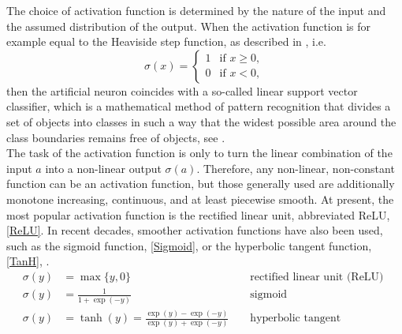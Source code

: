 The choice of activation function is determined by the nature of the input and the assumed distribution of the output. When the activation function is for example equal to the Heaviside step function, as described in \cite{Rosenblatt:1958}, i.e.
\begin{equation*}
    \sigma(x) = \begin{cases} 1 & \text{if } x \geq 0, \\ 0 & \text{if } x < 0, \end{cases}
\end{equation*}
then the artificial neuron coincides with a so-called linear support vector classifier, which is a mathematical method of pattern recognition that divides a set of objects into classes in such a way that the widest possible area around the class boundaries remains free of objects, see \cite[Chapter~7]{Bishop:2006}. \\
The task of the activation function is only to turn the linear combination of the input $a$ into a non-linear output $\sigma(a)$. Therefore, any non-linear, non-constant function can be an activation function, but those generally used are additionally monotone increasing, continuous, and at least piecewise smooth. At present, the most popular activation function is the rectified linear unit, abbreviated ReLU, \cref{ReLU}. In recent decades, smoother activation functions have also been used, such as the sigmoid function, \cref{Sigmoid}, or the hyperbolic tangent function, \cref{TanH}, \cite[p.~3]{LeCunBengioHinton:2015}.
\begin{align}
    \sigma(y) &=\max \{y, 0\} & & \text{ rectified linear unit (ReLU) } \label{ReLU} \\
    \sigma(y) &=\frac{1}{1+\exp (-y)} & & \text{ sigmoid } \label{Sigmoid} \\
    \sigma(y) &=\tanh (y)=\frac{\exp (y)-\exp (-y)}{\exp (y)+\exp (-y)} & & \text{ hyperbolic tangent } \label{TanH}
\end{align}

